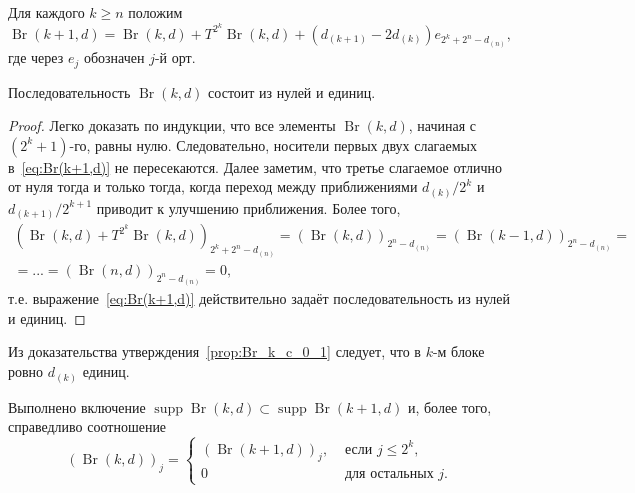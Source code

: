 Для каждого $k \geq n$ положим
\begin{equation}
	\label{eq:Br(k+1,d)}
	\operatorname{Br}(k+1,d) = \operatorname{Br}(k,d) + T^{2^k}\operatorname{Br}(k,d) + (d_{(k+1)}-2d_{(k)})e_{2^k+2^n-d_{(n)}}
	,
\end{equation}
где через $e_j$ обозначен $j$-й орт.


\begin{proposition}
	\label{prop:Br_k_c_0_1}
	Последовательность $\operatorname{Br}(k,d)$ состоит из нулей и единиц.
\end{proposition}
\begin{proof}
	Легко доказать по индукции, что все элементы $\operatorname{Br}(k,d)$, начиная с $(2^k+1)$-го, равны нулю.
	Следовательно, носители первых двух слагаемых в~\eqref{eq:Br(k+1,d)} не пересекаются.
	Далее заметим, что третье слагаемое отлично от нуля тогда и только тогда,
	когда переход между приближениями $d_{(k)} / 2^k$ и $d_{(k+1)}/2^{k+1}$
	приводит к улучшению приближения.
	Более того,
	\begin{multline}
		\left(\operatorname{Br}(k,d) + T^{2^k}\operatorname{Br}(k,d)\right)_{2^k+2^n-d_{(n)}}
		=
		(\operatorname{Br}(k,d))_{2^n-d_{(n)}}
		=
		(\operatorname{Br}(k-1,d))_{2^n-d_{(n)}}
		=
		\\=
		...
		=
		(\operatorname{Br}(n,d))_{2^n-d_{(n)}}
		=
		0
		,
	\end{multline}
	т.е. выражение~\eqref{eq:Br(k+1,d)} действительно задаёт последовательность из нулей и единиц.
\end{proof}

\begin{remark}
	Из доказательства утверждения~\ref{prop:Br_k_c_0_1} следует, что в $k$-м блоке ровно $d_{(k)}$ единиц.
\end{remark}


\begin{remark}
	Выполнено включение $\operatorname{supp}\operatorname{Br}(k,d) \subset \operatorname{supp}\operatorname{Br}(k+1,d)$
	и, более того, справедливо соотношение
	\begin{equation}
		(\operatorname{Br}(k,d))_j = \begin{cases}
			(\operatorname{Br}(k+1,d))_j, & \mbox{~если~}  j \leq 2^k,
			\\
			0  & \mbox{~для остальных~} j
			.
		\end{cases}
	\end{equation}
\end{remark}

